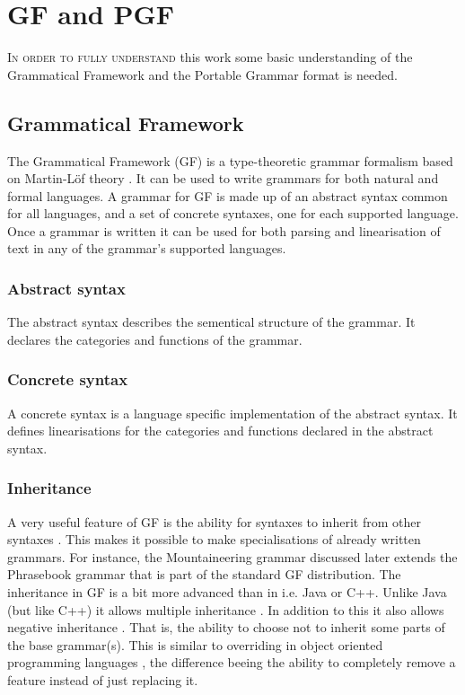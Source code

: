 \chapter{GF and PGF}
\lettrine[lines=4, loversize=-0.1, lraise=0.1]{I}{n order to fully understand} this work some basic understanding of the Grammatical Framework and the Portable Grammar format is needed.

\section{Grammatical Framework}
The Grammatical Framework (GF) is a type-theoretic grammar formalism based on Martin-L\"of theory \cite{martinloftheory}. It can be used to write grammars for both natural and formal languages.
A grammar for GF is made up of an abstract syntax common for all languages, and a set of concrete syntaxes, one for each supported language.
Once a grammar is written it can be used for both parsing and linearisation of text in any of the grammar's supported languages.

\subsection{Abstract syntax}
The abstract syntax describes the sementical structure of the grammar. It declares the categories and functions of the grammar.\cite{gfabsyn}

\subsection{Concrete syntax}
A concrete syntax is a language specific implementation of the abstract syntax. It defines linearisations for the categories and functions declared in the abstract syntax. \cite{gfconcrete}

\subsection{Inheritance}
A very useful feature of GF is the ability for syntaxes to inherit from other syntaxes \cite{gfinheritance}. This makes it possible to make specialisations of already written grammars. For instance, the Mountaineering grammar discussed later extends the Phrasebook grammar that is part of the standard GF distribution.
The inheritance in GF is a bit more advanced than in i.e. Java or C++. Unlike Java (but like C++) it allows multiple inheritance \cite{javalangspec} \cite{cxx11}. In addition to this it also allows negative inheritance \cite{gfneginherit}. That is, the ability to choose not to inherit some parts of the base grammar(s). This is similar to overriding in object oriented programming languages \cite{overriding}, the difference beeing the ability to completely remove a feature instead of just replacing it.

